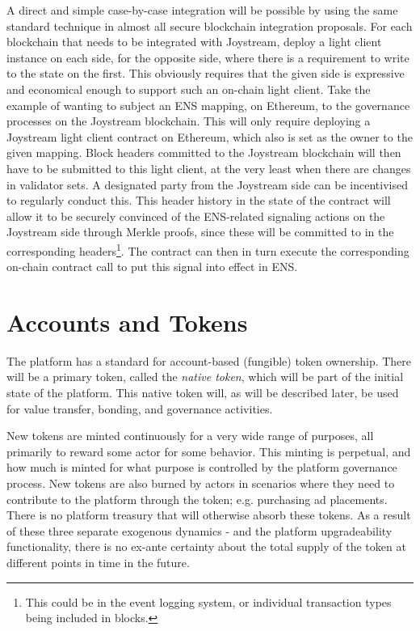 \documentclass{article}
\begin{document}
A direct and simple case-by-case integration will be possible by using the same standard technique in almost all secure blockchain integration proposals. For each blockchain that needs to be integrated with Joystream, deploy a light client instance on each side, for the opposite side, where there is a requirement to write to the state on the first. This obviously requires that the given side is expressive and economical enough to support such an on-chain light client. Take the example of wanting to subject an ENS mapping, on Ethereum, to the governance processes on the Joystream blockchain. This will only require deploying a Joystream light client contract on Ethereum, which also is set as the owner to the given mapping. Block headers committed to the Joystream blockchain will then have to be submitted to this light client, at the very least when there are changes in validator sets. A designated party from the Joystream side can be incentivised to regularly conduct this. This header history in the state of the contract will allow it to be securely convinced of the ENS-related signaling actions on the Joystream side through Merkle proofs, since these will be committed to in the corresponding headers\footnote{This could be in the event logging system, or individual transaction types being included in blocks.}. The contract can then in turn execute the corresponding on-chain contract call to put this signal into effect in ENS.


\section{Accounts and Tokens} \label{sec:accounts_and_tokens}

The platform has a standard for account-based (fungible) token ownership. There will be a primary token, called the \textit{native token}, which will be part of the initial state of the platform. This native token will, as will be described later, be used for value transfer, bonding, and governance activities.

New tokens are minted continuously for a very wide range of purposes, all primarily to reward some actor for some behavior. This minting is perpetual, and how much is minted for what purpose is controlled by the platform governance process. New tokens are also burned by actors in scenarios where they need to contribute to the platform through the token; e.g. purchasing ad placements. There is no platform treasury that will otherwise absorb these tokens. As a result of these three separate exogenous dynamics - and the platform upgradeability functionality, there is no ex-ante certainty about the total supply of the token at different points in time in the future.
\end{document}

